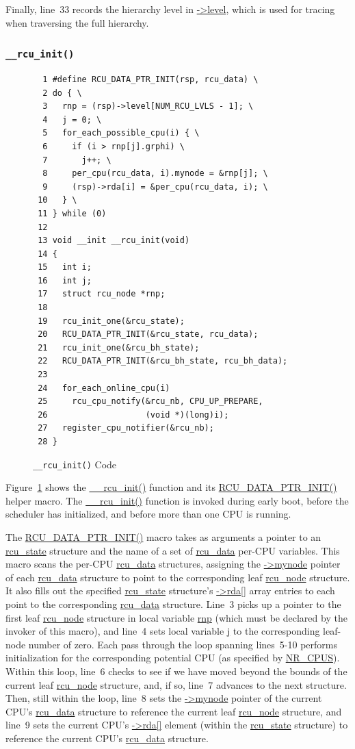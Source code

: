 Finally, line~33 records the hierarchy level in \url{->level},
which is used for tracing when traversing the full hierarchy.

\subsubsection{\tt \_\_rcu\_init()}
\label{app:rcuimpl:rcutreewt:rcu-init}

\begin{figure}[tbp]
{ \scriptsize
\begin{verbatim}
  1 #define RCU_DATA_PTR_INIT(rsp, rcu_data) \
  2 do { \
  3   rnp = (rsp)->level[NUM_RCU_LVLS - 1]; \
  4   j = 0; \
  5   for_each_possible_cpu(i) { \
  6     if (i > rnp[j].grphi) \
  7       j++; \
  8     per_cpu(rcu_data, i).mynode = &rnp[j]; \
  9     (rsp)->rda[i] = &per_cpu(rcu_data, i); \
 10   } \
 11 } while (0)
 12 
 13 void __init __rcu_init(void)
 14 {
 15   int i;
 16   int j;
 17   struct rcu_node *rnp;
 18 
 19   rcu_init_one(&rcu_state);
 20   RCU_DATA_PTR_INIT(&rcu_state, rcu_data);
 21   rcu_init_one(&rcu_bh_state);
 22   RCU_DATA_PTR_INIT(&rcu_bh_state, rcu_bh_data);
 23 
 24   for_each_online_cpu(i)
 25     rcu_cpu_notify(&rcu_nb, CPU_UP_PREPARE,
 26                    (void *)(long)i);
 27   register_cpu_notifier(&rcu_nb);
 28 }
\end{verbatim}
}
\caption{{\tt \_\_rcu\_init()} Code}
\label{fig:app:rcuimpl:rcutreewt:Code for rcu-init}
\end{figure}

Figure~\ref{fig:app:rcuimpl:rcutreewt:Code for rcu-init}
shows the \url{__rcu_init()} function and its \url{RCU_DATA_PTR_INIT()}
helper macro.
The \url{__rcu_init()} function is invoked during early boot,
before the scheduler has initialized, and before more than one
CPU is running.

The \url{RCU_DATA_PTR_INIT()} macro takes as arguments a pointer to
an \url{rcu_state} structure and the name of a set of \url{rcu_data}
per-CPU variables.
This macro scans the per-CPU \url{rcu_data}
structures, assigning the \url{->mynode} pointer of each \url{rcu_data}
structure to point to the corresponding leaf \url{rcu_node} structure.
It also fills out the specified \url{rcu_state} structure's
\url{->rda[]} array entries to each point to the corresponding
\url{rcu_data} structure.
Line~3 picks up a pointer to the first leaf \url{rcu_node} structure
in local variable \url{rnp} (which must be declared by the invoker of
this macro),
and line~4 sets local variable \url{j} to the corresponding leaf-node
number of zero.
Each pass through the loop spanning lines~5-10 performs initialization
for the corresponding potential CPU (as specified by \url{NR_CPUS}).
Within this loop, line~6 checks to see if we have moved beyond the
bounds of the current leaf \url{rcu_node} structure, and, if so,
line~7 advances to the next structure.
Then, still within the loop, line~8 sets the \url{->mynode} pointer
of the current CPU's \url{rcu_data} structure to reference the current
leaf \url{rcu_node} structure, and line~9 sets the current CPU's \url{->rda[]}
element (within the \url{rcu_state} structure) to reference the
current CPU's \url{rcu_data} structure.

